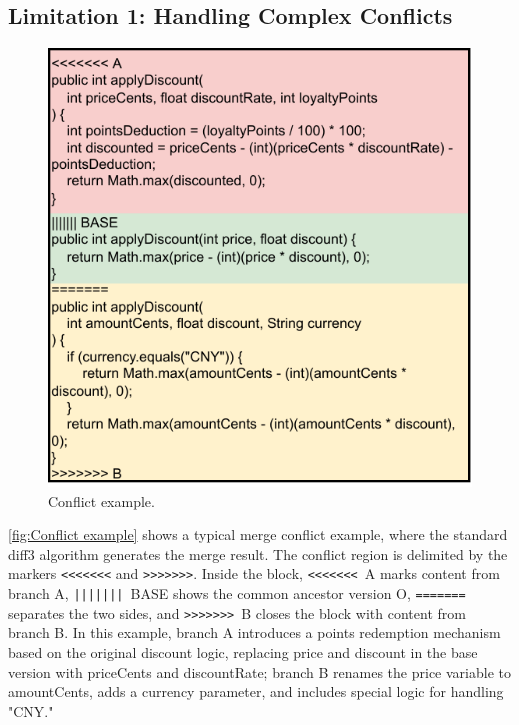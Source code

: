 \documentclass[sigconf,review,anonymous]{acmart}
\begin{document}
\subsection{Limitation 1: Handling Complex Conflicts}
\begin{figure}[b]
    \centering
    \includegraphics[width=1\linewidth]{Figures/Conflict example diagram.pdf}
    \caption{Conflict example.}
    \label{fig:Conflict example}
\end{figure}

\autoref{fig:Conflict example} shows a typical merge conflict example, where the standard diff3 algorithm generates the merge result.
The conflict region is delimited by the markers \verb|<<<<<<<| and \verb|>>>>>>>|. Inside the block, \verb|<<<<<<<|\ A marks content from branch A, \verb+|||||||+\ BASE shows the common ancestor version O, \verb|=======| separates the two sides, and \verb|>>>>>>>|\ B closes the block with content from branch B. In this example, branch A introduces a points redemption mechanism based on the original discount logic, replacing price and discount in the base version with priceCents and discountRate; branch B renames the price variable to amountCents, adds a currency parameter, and includes special logic for handling "CNY."
\end{document}
